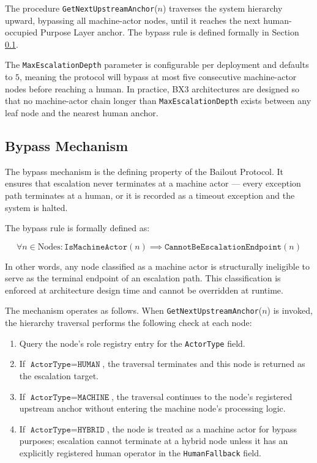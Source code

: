 The procedure \texttt{GetNextUpstreamAnchor}($n$) traverses the system hierarchy upward, bypassing all machine-actor nodes, until it reaches the next human-occupied Purpose Layer anchor. The bypass rule is defined formally in Section \ref{sec:bypass}.

The \texttt{MaxEscalationDepth} parameter is configurable per deployment and defaults to $5$, meaning the protocol will bypass at most five consecutive machine-actor nodes before reaching a human. In practice, BX3 architectures are designed so that no machine-actor chain longer than \texttt{MaxEscalationDepth} exists between any leaf node and the nearest human anchor.

\subsection{Bypass Mechanism}
\label{sec:bypass}

The bypass mechanism is the defining property of the Bailout Protocol. It ensures that escalation never terminates at a machine actor --- every exception path terminates at a human, or it is recorded as a timeout exception and the system is halted.

The bypass rule is formally defined as:

\[
\forall n \in \text{Nodes} : \texttt{IsMachineActor}(n) \implies \texttt{CannotBeEscalationEndpoint}(n)
\]

In other words, any node classified as a machine actor is structurally ineligible to serve as the terminal endpoint of an escalation path. This classification is enforced at architecture design time and cannot be overridden at runtime.

The mechanism operates as follows. When \texttt{GetNextUpstreamAnchor}($n$) is invoked, the hierarchy traversal performs the following check at each node:

\begin{enumerate}
    \item Query the node's role registry entry for the \texttt{ActorType} field.
    \item If $\texttt{ActorType} = \texttt{HUMAN}$, the traversal terminates and this node is returned as the escalation target.
    \item If $\texttt{ActorType} = \texttt{MACHINE}$, the traversal continues to the node's registered upstream anchor without entering the machine node's processing logic.
    \item If $\texttt{ActorType} = \texttt{HYBRID}$, the node is treated as a machine actor for bypass purposes; escalation cannot terminate at a hybrid node unless it has an explicitly registered human operator in the \texttt{HumanFallback} field.
\end{enumerate}

